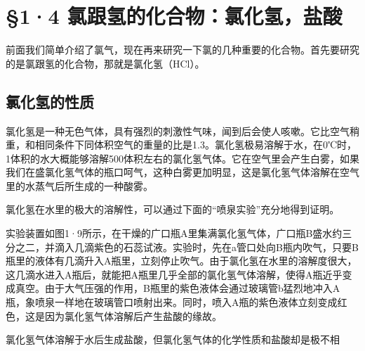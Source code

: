 \section{§1·4 氯跟氢的化合物：氯化氢，盐酸}

前面我们简单介绍了氯气，现在再来研究一下氯的几种重要的化合物。首先要研究的是氯跟氢的化合物，那就是氯化氢（HCl）。

\subsection{氯化氢的性质}

氯化氢是一种无色气体，具有强烈的刺激性气味，闻到后会使人咳嗽。它比空气稍重，和相同条件下同体积空气的重量的比是1.3。氯化氢极易溶解于水，在0℃时，1体积的水大概能够溶解500体积左右的氯化氢气体。它在空气里会产生白雾，如果我们在盛氯化氢气体的瓶口呵气，这种白雾更加明显，这是氯化氢气体溶解在空气里的水蒸气后所生成的一种酸雾。

氯化氢在水里的极大的溶解性，可以通过下面的``喷泉实验''充分地得到证明。

实验装置如图1·9所示，在干燥的广口瓶A里集满氯化氢气体，广口瓶B盛水约三分之二，并滴入几滴紫色的石蕊试液。实验时，先在a管口处向B瓶内吹气，只要B瓶里的液体有几滴升入A瓶里，立刻停止吹气。由于氯化氢在水里的溶解度很大，这几滴水进入A瓶后，就能把A瓶里几乎全部的氯化氢气体溶解，使得A瓶近乎变成真空。由于大气压强的作用，B瓶里的紫色液体会通过玻璃管b猛烈地冲入A瓶，象喷泉一样地在玻璃管口喷射出来。同时，喷入A瓶的紫色液体立刻变成红色，这是因为氯化氢气体溶解后产生盐酸的缘故。

氯化氢气体溶解于水后生成盐酸，但氯化氢气体的化学性质和盐酸却是极不相

